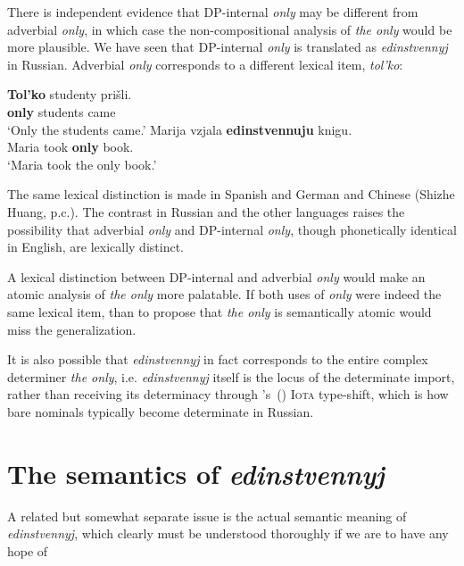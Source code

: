 \documentclass{article}
\newcommand{\citegen}[1]{\citeauthor{#1}'s~(\citeyear{#1})}
\begin{document}
There is independent evidence that DP-internal \textit{only} may be different from adverbial \textit{only}, in which case the non-compositional analysis of \textit{the only} would be more plausible. We have seen that DP-internal \textit{only} is translated as \textit{edinstvennyj} in Russian. Adverbial \textit{only} corresponds to a different lexical item, \textit{tol'ko}:

\begin{exe}
	\ex \label{only-tolko} \gll \textbf{Tol'ko} studenty pri\v{s}li.\\
	\textbf{only} students came\\
	\glt `Only the students came.'
	\ex \label{only-edin} \gll Marija vzjala \textbf{edinstvennuju} knigu.\\
	Maria took \textbf{only} book.\\
	\glt `Maria took the only book.'
\end{exe}

The same lexical distinction is made in Spanish and German \citep{mcnally08} and Chinese (Shizhe Huang, p.c.). The contrast in Russian and the other languages raises the possibility that adverbial \textit{only} and DP-internal \textit{only}, though phonetically identical in English, are lexically distinct.

A lexical distinction between DP-internal and adverbial \textit{only} would make an atomic analysis of \textit{the only} more palatable. If both uses of \textit{only} were indeed the same lexical item, than to propose that \textit{the only} is semantically atomic would miss the generalization. %

It is also possible that \textit{edinstvennyj} in fact corresponds to the entire complex determiner \textit{the only}, i.e. \textit{edinstvennyj} itself is the locus of the determinate import, rather than receiving its determinacy through \citegen{partee86} \textsc{Iota} type-shift, which is how bare nominals typically become determinate in Russian.




\section{The semantics of \textit{edinstvennyj} \label{sec:which-edin}}
A related but somewhat separate issue is the actual semantic meaning of \textit{edinstvennyj}, which clearly must be understood thoroughly if we are to have any hope of
\end{document}
